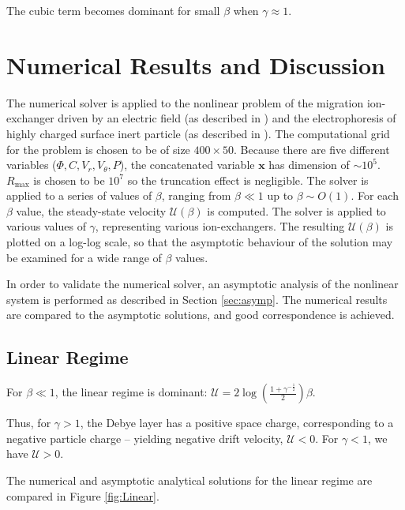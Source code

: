 \documentclass[10pt]{ijnam}
\newcommand{\pars}[1]{\left(#1\right)}
\newcommand\bx{\boldsymbol{x}}
\newcommand\cU{\mathscr{U}}
\begin{document}
The cubic term becomes dominant for small $\beta$ when $\gamma \approx 1$.

\section{Numerical Results and Discussion} \label{sec:results}
The numerical solver is applied to the nonlinear problem of the migration ion-exchanger
driven by an electric field (as described in \cite{yariv2010migration})
and the electrophoresis of highly charged surface inert particle 
(as described in \cite{schnitzer2012surface}). 
The computational grid for the problem is chosen to be of size $400 \times 50$.
Because there are five different variables ($\varPhi, C, V_r, V_\theta, P$), the concatenated
variable $\bx$ has dimension of $\sim 10^5$.
$R_{\max}$ is chosen to be $10^{7}$ so the truncation effect is negligible.
The solver is applied to a series of values of $\beta$, ranging 
from $\beta \ll 1$ up to $\beta \sim O(1)$.
For each $\beta$ value, the steady-state velocity $\cU(\beta)$ is computed. The solver
is applied to various values of $\gamma$, representing various ion-exchangers.
The resulting $\cU(\beta)$ is plotted on a log-log scale, so that the asymptotic behaviour
of the solution may be examined for a wide range of $\beta$ values.

In order to validate the numerical solver, an asymptotic analysis of the nonlinear system
is performed as described in Section \ref{sec:asymp}. The numerical results are compared 
to the asymptotic solutions, and good correspondence is achieved.

\subsection{Linear Regime}
For $\beta \ll 1$, the linear regime is dominant: $\cU = 2\log\pars{\frac{1 + \gamma^{-\frac{1}{2}}}{2}}\beta$.

Thus, for $\gamma > 1$, the Debye layer has a positive space charge, corresponding to a negative
particle charge -- yielding negative drift velocity, $\cU < 0$. 
For $\gamma < 1$, we have $\cU > 0$.

The numerical and asymptotic analytical solutions for the linear regime are compared 
in Figure \ref{fig:Linear}.
\end{document}
